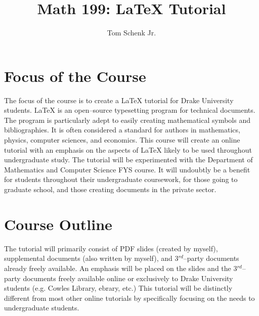 \documentclass{article}
\title{Math 199: \LaTeX\mbox{} Tutorial}
\author{Tom Schenk Jr.}
\begin{document}
\maketitle
\section{Focus of the Course}

The focus of the course is to create a \LaTeX\mbox{} tutorial for Drake University students. \LaTeX\mbox{} is an open--source typesetting program for technical documents. The program is particularly adept to easily creating mathematical symbols and bibliographies. It is often considered a standard for authors in mathematics, physics, computer sciences, and economics. This course will create an online tutorial with an emphasis on the aspects of \LaTeX\mbox{} likely to be used throughout undergraduate study. The tutorial will be experimented with the Department of Mathematics and Computer Science FYS course. It will undoubtly be a benefit for students throughout their undergraduate coursework, for those going to graduate school, and those creating documents in the private sector.

\section{Course Outline}

The tutorial will primarily consist of PDF slides (created by myself), supplemental documents (also written by myself), and 3$^{rd}$--party documents already freely available. An emphasis will be placed on the slides and the 3$^{rd}$--party documents freely available online or exclusively to Drake University students (e.g. Cowles Library, ebrary, etc.) This tutorial will be distinctly different from most other online tutorials by specifically focusing on the needs to undergraduate students.
\end{document}
